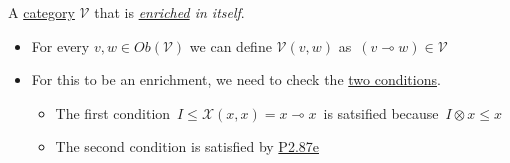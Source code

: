 A \hyperref[D2.46]{category} $\mathcal{V}$ that is \emph{\hyperref[D2.46]{enriched} in itself}.

\begin{itemize}
    \item  For every $v,w \in Ob(\mathcal{V})$ we can define $\mathcal{V}(v,w)$ as \,$(v \multimap w) \in \mathcal{V}$\,
    \item For this to be an enrichment, we need to check the \hyperref[D2.46]{two conditions}.
          \begin{itemize}
            \item The first condition \,$I \leq \mathcal{X}(x,x) = x \multimap x$\, is satsified because \,$I \otimes x \leq x$\,
            \item The second condition is satisfied by \hyperref[P2.87]{P2.87e}

          \end{itemize}
  \end{itemize}

